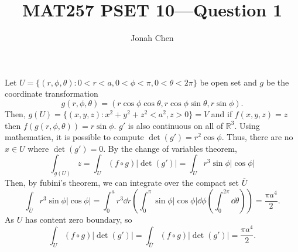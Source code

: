 \documentclass{exam}
\title{MAT257 PSET 10---Question 1}
\author{Jonah Chen}
\date{}
\numberwithin{equation}{section}
\newcommand{\R}{\mathbb{R}}
\begin{document}
    \sffamily
    \maketitle
    Let \(U=\{(r,\phi,\theta):0<r<a, 0<\phi<\pi,0<\theta<2\pi\}\) be open set and $g$ be the coordinate transformation \[g(r,\phi,\theta)=(r\cos\phi\cos\theta,r\cos\phi\sin\theta,r\sin\phi).\] Then, \(g(U)=\{(x,y,z):x^2+y^2+z^2<a^2, z>0\}=V\) and if \(f(x,y,z)=z\) then \(f(g(r,\phi,\theta))=r\sin\phi\). \(g'\) is also continuous on all of \(\R^3\). Using mathematica, it is possible to compute \(\det(g')=r^2\cos\phi.\) Thus, there are no $x\in U$ where \(\det(g')=0\). By the change of variables theorem,
    \begin{equation*}
        \int_{g(U)}z=\int_U(f\circ g)|\det(g')|=\int_Ur^3\sin\phi|\cos\phi|
    \end{equation*}
     Then, by fubini's theorem, we can integrate over the compact set \(\overline U\)
    \begin{equation*}
        \int_{\overline U}r^3\sin\phi|\cos\phi|=\int_0^ar^3\dd r\left(\int_0^\pi\sin\phi|\cos\phi|\dd\phi\left(\int_0^{2\pi}\dd\theta\right)\right)=\frac{\pi a^4}{2}.
    \end{equation*}
    As \(U\) has content zero boundary, so \[\int_U(f\circ g)|\det(g')|=\int_{\overline U}(f\circ g)|\det(g')|=\frac{\pi a^4}{2}.\]
\end{document}
